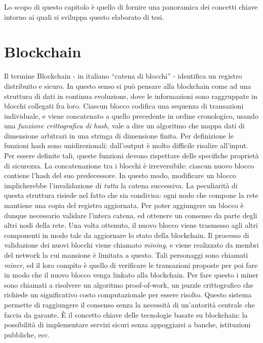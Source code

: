 
Lo scopo di questo capitolo è quello di fornire una panoramica dei concetti chiave intorno ai quali si sviluppa questo elaborato di tesi.

\section{Blockchain}

Il termine Blockchain - in italiano ``catena di blocchi'' - identifica un registro distribuito e sicuro. In questo senso si può pensare alla blockchain come ad una struttura di dati in continua evoluzione, dove le informazioni sono raggruppate in blocchi collegati fra loro.\newline
\indent Ciascun blocco codifica una sequenza di transazioni individuale, e viene concatenato a quello precedente in ordine cronologico, usando una \textit{funzione crittografica di hash}, vale a dire un algoritmo che mappa dati di dimensione arbitrari in una stringa di dimensione finita. Per definizione le funzioni hash sono unidirezionali: dall'output è molto difficile risalire all'input. Per essere definite tali, queste funzioni devono rispettare delle specifiche proprietà di sicurezza.
La concatenazione tra i blocchi è irreversibile: ciascun nuovo blocco contiene l'hash del suo predecessore. In questo modo, modificare un blocco implicherebbe l'invalidazione di \emph{tutta} la catena successiva.\newline  
\indent La peculiarità di questa struttura risiede nel fatto che sia condivisa: ogni nodo che compone la rete mantiene una copia del registro aggiornata. Per poter aggiungere un blocco è dunque necessario validare l'intera catena, ed ottenere un consenso da parte degli altri nodi della rete. Una volta ottenuto, il nuovo blocco viene trasmesso agli altri componenti in modo tale da aggiornare lo stato della blockchain.\newline
\indent Il processo di validazione dei nuovi blocchi viene chiamato \textit{mining}, e viene realizzato da membri del network la cui mansione è limitata a questo. Tali personaggi sono chiamati \textit{miner}, ed il loro compito è quello di verificare le transazioni proposte per poi fare in modo che il nuovo blocco venga linkato alla blockchain. Per fare questo i miner sono chiamati a risolvere un algoritmo proof-of-work, un puzzle crittografico che richiede un significativo costo computazionale per essere risolto.\newline
\indent Questo sistema permette di raggiungere il consenso senza la necessità di un'autorità centrale che faccia da garante. \`E il concetto chiave delle tecnologie basate su blockchain: la possibilità di implementare servizi sicuri senza appoggiarsi a banche, istituzioni pubbliche, ecc.\newline
